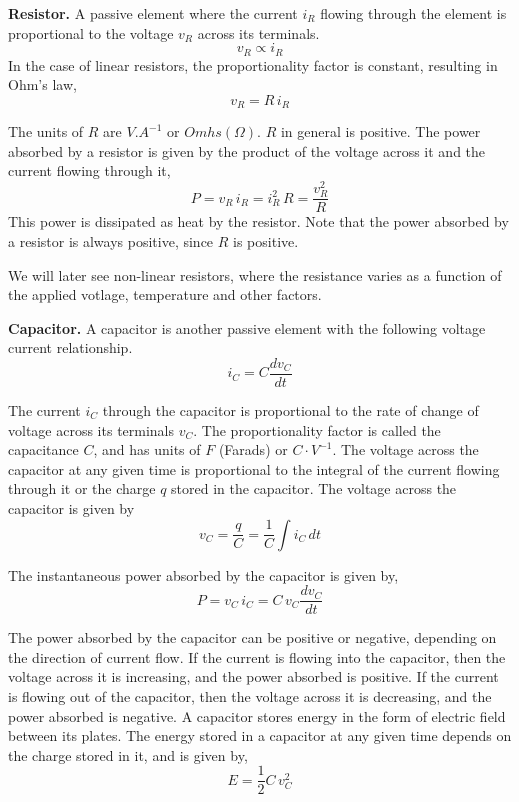 \noindent \textbf{Resistor.} A passive element where the current $i_R$ flowing through the element is proportional to the voltage $v_R$ across its terminals.
\[ v_R \propto i_R \]
In the case of linear resistors, the proportionality factor is constant, resulting in Ohm's law,
\begin{equation}
    v_R = R \, i_R
    \label{eq:02-01}
\end{equation}

The units of $R$ are $V.A^{-1}$ or $Omhs \left( \Omega \right)$. $R$ in general is positive. The power absorbed by a resistor is given by the product of the voltage across it and the current flowing through it, 
\begin{equation}
    P = v_R \, i_R = i_R^2 \, R = \frac{v_R^2}{R}
    \label{eq:02-02}
\end{equation}
This power is dissipated as heat by the resistor. Note that the power absorbed by a resistor is always positive, since $R$ is positive.

We will later see non-linear resistors, where the resistance varies as a function of the applied votlage, temperature and other factors. 

\noindent \textbf{Capacitor.} A capacitor is another passive element with the following voltage current relationship.
\begin{equation}
    i_C = C \frac{d v_C}{dt}
    \label{eq:02-03}
\end{equation}

The current $i_C$ through the capacitor is proportional to the rate of change of voltage across its terminals $v_C$. The proportionality factor is called the capacitance $C$, and has units of $F$ (Farads) or $C \cdot V^{-1}$. The voltage across the capacitor at any given time is proportional to the integral of the current flowing through it or the charge  $q$ stored in the capacitor. The voltage across the capacitor is given by
\begin{equation}
    v_C = \frac{q}{C} = \frac{1}{C}\int i_C \, dt
    \label{eq:02-04}
\end{equation}

The instantaneous power absorbed by the capacitor is given by,
\begin{equation}
    P = v_C \, i_C = C \, v_C \frac{d v_C}{dt}
    \label{eq:02-05}
\end{equation}

The power absorbed by the capacitor can be positive or negative, depending on the direction of current flow. If the current is flowing into the capacitor, then the voltage across it is increasing, and the power absorbed is positive. If the current is flowing out of the capacitor, then the voltage across it is decreasing, and the power absorbed is negative. A capacitor stores energy in the form of electric field between its plates. The energy stored in a capacitor at any given time depends on the charge stored in it, and is given by,
\begin{equation}
    E = \frac{1}{2}  C \, v_C^2
    \label{eq:02-06}
\end{equation}

